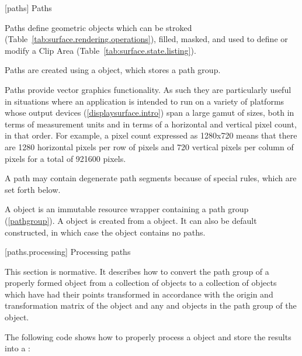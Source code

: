 
 [paths] {Paths}

\pnum
Paths define geometric objects which can be stroked (Table~\ref{tab:surface.rendering.operations}), filled, masked, and used to define or modify a Clip Area (Table~\ref{tab:surface.state.listing}).

\pnum
Paths are created using a  object, which stores a path group. 

\pnum
Paths provide vector graphics functionality. As such they are particularly useful in situations where an application is intended to run on a variety of platforms whose output devices (\ref{displaysurface.intro}) span a large gamut of sizes, both in terms of measurement units and in terms of a horizontal and vertical pixel count, in that order. For example, a pixel count expressed as 1280x720 means that there are 1280 horizontal pixels per row of pixels and 720 vertical pixels per column of pixels for a total of 921600 pixels.
%

\pnum
A path may contain degenerate path segments because of special rules, which are set forth below.

\pnum
A  object is an immutable resource wrapper containing a path group (\ref{pathgroup}). A  object is created from a  object. It can also be default constructed, in which case the  object contains no paths.

 [paths.processing] {Processing paths}

\pnum
This section is normative. It describes how to convert the path group of a properly formed  object from a collection of  objects to a collection of  objects which have had their points transformed in accordance with the origin and transformation matrix of the  object and any  and  objects in the path group of the  object.

\pnum
The following code shows how to properly process a  object  and store the results into a :

